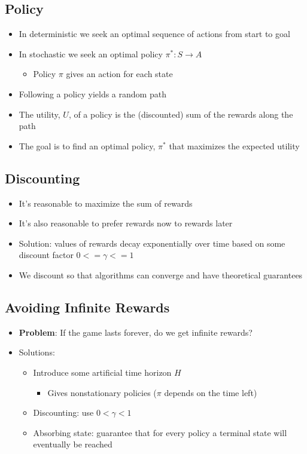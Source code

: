 \documentclass[11pt]{article}
\begin{document}
\subsection{Policy}
\label{sec:org1a78a40}
\begin{itemize}
\item In deterministic we seek an optimal sequence of actions from start to goal
\item In stochastic we seek an optimal policy \(\pi^*:S \rightarrow A\)
\begin{itemize}
\item Policy \(\pi\) gives an action for each state
\end{itemize}
\item Following a policy yields a random path
\item The utility, \(U\), of a policy is the (discounted) sum of the rewards along the path
\item The goal is to find an optimal policy, \(\pi^*\) that maximizes the expected utility
\end{itemize}
\subsection{Discounting}
\label{sec:org1ca20cc}
\begin{itemize}
\item It's reasonable to maximize the sum of rewards
\item It's also reasonable to prefer rewards now to rewards later
\item Solution: values of rewards decay exponentially over time based on some discount factor \(0 <= \gamma <= 1\)
\item We discount so that algorithms can converge and have theoretical guarantees
\end{itemize}
\subsection{Avoiding Infinite Rewards}
\label{sec:orgaa4a59c}
\begin{itemize}
\item \textbf{Problem}: If the game lasts forever, do we get infinite rewards?
\item Solutions:
\begin{itemize}
\item Introduce some artificial time horizon \(H\)
\begin{itemize}
\item Gives nonstationary policies (\(\pi\) depends on the time left)
\end{itemize}
\item Discounting: use \(0< \gamma <1\)
\item Absorbing state: guarantee that for every policy a terminal state will eventually be reached
\end{itemize}
\end{itemize}
\end{document}
